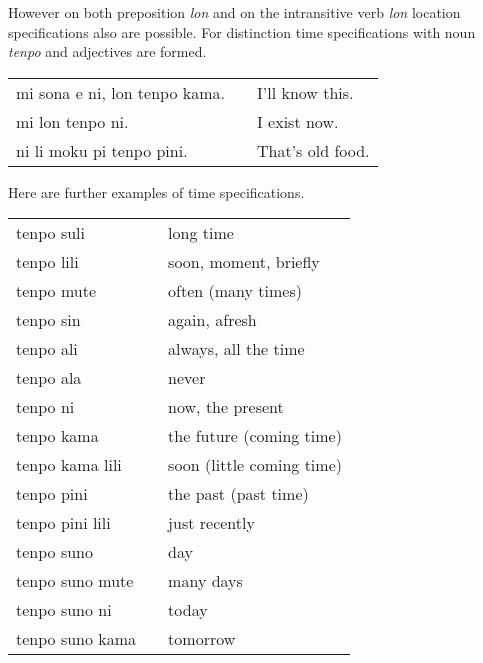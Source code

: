 However on both preposition \textit{lon} and on the intransitive verb \textit{lon} location specifications also are possible.
For distinction time specifications with noun \textit{tenpo} and adjectives are formed.

\begin{supertabular}{p{5,5cm}|ll}
    mi sona e ni, lon tenpo kama. &  & I'll know this.  \\
    mi lon tenpo ni.              &  & I exist now.     \\
    ni li moku pi tenpo pini.     &  & That's old food. \\
\end{supertabular}

Here are further examples of time specifications.

\begin{supertabular}{p{5,5cm}|ll}
    tenpo suli                             &  & long time                 \\
    tenpo lili                             &  & soon, moment, briefly     \\
    tenpo mute                             &  & often (many times)        \\
    tenpo sin                              &  & again, afresh             \\
    tenpo ali                              &  & always, all the time      \\
    tenpo ala                              &  & never                     \\
    tenpo ni                               &  & now, the present          \\
    tenpo kama                             &  & the future (coming time)  \\
    tenpo kama lili                        &  & soon (little coming time) \\
    tenpo pini                             &  & the past (past time)      \\
    tenpo pini lili                        &  & just recently             \\
    tenpo suno                             &  & day                       \\
    tenpo suno mute                        &  & many days                 \\
    tenpo suno ni                          &  & today                     \\
    tenpo suno kama                        &  & tomorrow                  \\

\end{supertabular}
